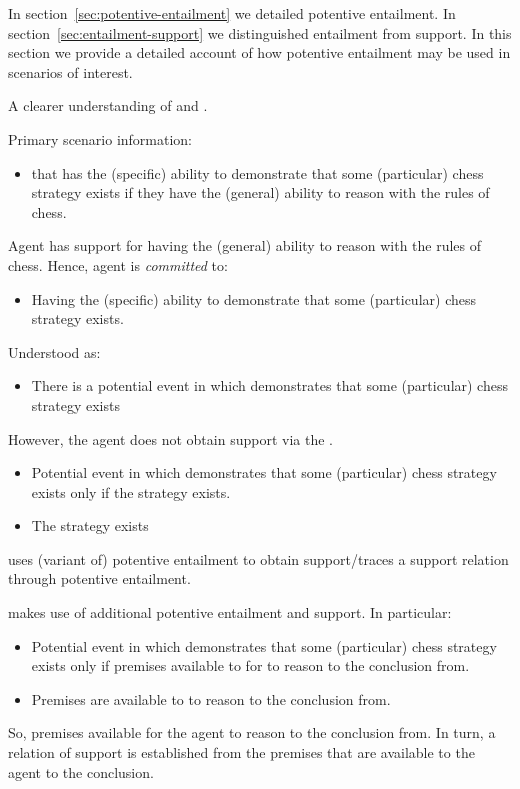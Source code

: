 \begin{note}[Overview]
  In section~\ref{sec:potentive-entailment} we detailed potentive entailment.
  In section~\ref{sec:entailment-support} we distinguished entailment from support.
  In this section we provide a detailed account of how potentive entailment may be used in scenarios of interest.

  A clearer understanding of \AR{} and \WR{}.

  Primary scenario information:
  \begin{itemize}
  \item \gsi{} that \agent{} has the (specific) ability to demonstrate that some (particular) chess strategy exists if they have the (general) ability to reason with the rules of chess.
  \end{itemize}
  Agent has support for having the (general) ability to reason with the rules of chess.
  Hence, agent is \emph{committed} to:
  \begin{itemize}
  \item Having the (specific) ability to demonstrate that some (particular) chess strategy exists.
  \end{itemize}
  Understood as:
  \begin{itemize}
  \item There is a potential event in which \agent{} demonstrates that some (particular) chess strategy exists
  \end{itemize}
  However, the agent does not obtain support via the \gsi{}.

  \begin{itemize}
  \item\label{ent:ex:chess:Restated} Potential event in which \agent{} demonstrates that some (particular) chess strategy exists only if the strategy exists.
  \item The strategy exists
  \end{itemize}

  \AR{} uses (variant of) potentive entailment to obtain support/traces a support relation through potentive entailment.

  \WR{} makes use of additional potentive entailment and support.
  In particular:

  \begin{itemize}
  \item Potential event in which \agent{} demonstrates that some (particular) chess strategy exists only if premises available to \agent{} for \agent{} to reason to the conclusion from.
  \item Premises are available to \agent{} to reason to the conclusion from.
  \end{itemize}

  So, premises available for the agent to reason to the conclusion from.
  In turn, a relation of support is established from the premises that are available to the agent to the conclusion.
\end{note}

